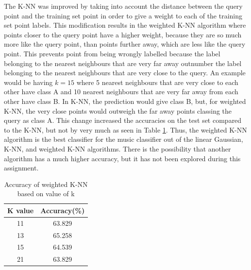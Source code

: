\documentclass[11pt]{scrartcl}
\begin{document}
The K-NN was improved by taking into account the distance between the query point and the training set point in order to give a weight to each of the training set point labels. This modification results in the weighted K-NN algorithm where points closer to the query point have a higher weight, because they are so much more like the query point, than points further away, which are less like the query point. This prevents point from being wrongly labelled because the label belonging to the nearest neighbours that are very far away outnumber the label belonging to the nearest neighbours that are very close to the query. An example would be having $k=15$ where 5 nearest neighbours that are very close to each other have class A and 10 nearest neighbours that are very far away from each other have class B. In K-NN, the prediction would give class B, but, for weighted K-NN, the very close points would outweigh the far away points classing the query as class A. This change increased the accuracies on the test set compared to the K-NN, but not by very much as seen in Table \ref{table:T1}. Thus, the weighted K-NN algorithm is the best classifier for the music classifier out of the linear Gaussian, K-NN, and weighted K-NN algorithms. There is the possibility that another algorithm has a much higher accuracy, but it has not been explored during this assignment.

\begin{table}[ht]
\centering
 \begin{tabular}{||c c||} 
 \hline
 K value & Accuracy(\%) \\ [0.5ex] 
 \hline\hline
 11 & 63.829 \\
 \hline
 13 & 65.258 \\ 
 \hline
 15 & 64.539 \\
 \hline
 21 & 63.829 \\[1ex] 
 \hline
\end{tabular}
\caption{Accuracy of weighted K-NN based on value of k}
\label{table:T1}
\end{table} 
\end{document}
